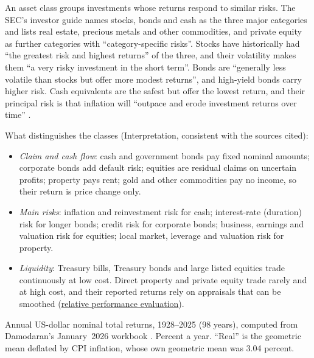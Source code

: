 \begin{qfdefinition}\label{def:asset-class-characteristics}
 An asset class groups investments whose returns respond to similar risks. The SEC's investor guide names stocks, bonds and cash as the three major categories and lists real estate, precious metals and other commodities, and private equity as further categories with ``category-specific risks''. Stocks have historically had ``the greatest risk and highest returns'' of the three, and their volatility makes them ``a very risky investment in the short term''. Bonds are ``generally less volatile than stocks but offer more modest returns'', and high-yield bonds carry higher risk. Cash equivalents are the safest but offer the lowest return, and their principal risk is that inflation will ``outpace and erode investment returns over time'' \citep[pp.~1--3]{asset-allocation-investor-guide}.

What distinguishes the classes (Interpretation, consistent with the sources cited):
\begin{itemize}
\item \emph{Claim and cash flow}: cash and government bonds pay fixed nominal amounts; corporate bonds add default risk; equities are residual claims on uncertain profits; property pays rent; gold and other commodities pay no income, so their return is price change only.
\item \emph{Main risks}: inflation and reinvestment risk for cash; interest-rate (duration) risk for longer bonds; credit risk for corporate bonds; business, earnings and valuation risk for equities; local market, leverage and valuation risk for property.
\item \emph{Liquidity}: Treasury bills, Treasury bonds and large listed equities trade continuously at low cost. Direct property and private equity trade rarely and at high cost, and their reported returns rely on appraisals that can be smoothed (\hyperref[meth:relative-performance-evaluation]{relative performance evaluation}).
\end{itemize}

 Annual US-dollar nominal total returns, 1928--2025 (98 years), computed from Damodaran's January~2026 workbook \citep[\texttt{histretSP.xls}, sheet ``Returns by year'']{us-asset-returns-1928-2025}. Percent a year. ``Real'' is the geometric mean deflated by CPI inflation, whose own geometric mean was 3.04 percent.


\end{qfdefinition}
